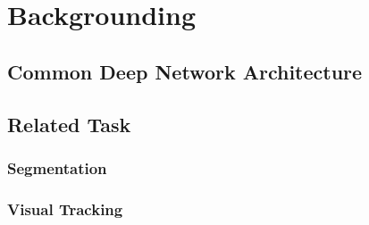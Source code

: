 \section{Backgrounding}

\subsection{Common Deep Network Architecture}

\subsection{Related Task}

\subsubsection{Segmentation}

\subsubsection{Visual Tracking}